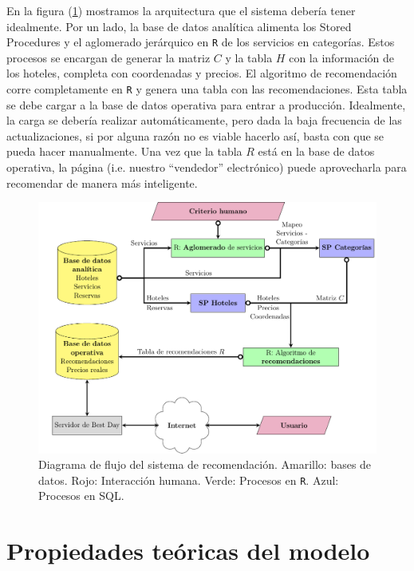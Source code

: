 \documentclass[12pt]{report}
\begin{document}
En la figura (\ref{fig:flujo}) mostramos la arquitectura que el sistema debería tener idealmente. Por un lado, la base de datos analítica alimenta los Stored Procedures y el aglomerado jerárquico en \texttt{R} de los servicios en categorías. Estos procesos se encargan de generar la matriz $C$ y la tabla $H$ con la información de los hoteles, completa con coordenadas y precios. El algoritmo de recomendación corre completamente en \texttt{R} y genera una tabla con las recomendaciones. Esta tabla se debe cargar a la base de datos operativa para entrar a producción. Idealmente, la carga se debería realizar automáticamente, pero dada la baja frecuencia de las actualizaciones, si por alguna razón no es viable hacerlo así, basta con que se pueda hacer manualmente. Una vez que la tabla $R$ está en la base de datos operativa, la página (i.e. nuestro ``vendedor'' electrónico) puede aprovecharla para recomendar de manera más inteligente.

\begin{figure}[ht]
	\centering
	\includegraphics[width=\textwidth]{imagenes/flowchart.pdf}
	\caption{\label{fig:flujo} Diagrama de flujo del sistema de recomendación. Amarillo: bases de datos. Rojo: Interacción humana. Verde: Procesos en \texttt{R}. Azul: Procesos en SQL.}
\end{figure}


\chapter{Propiedades teóricas del modelo} \label{cap:4}
\end{document}
